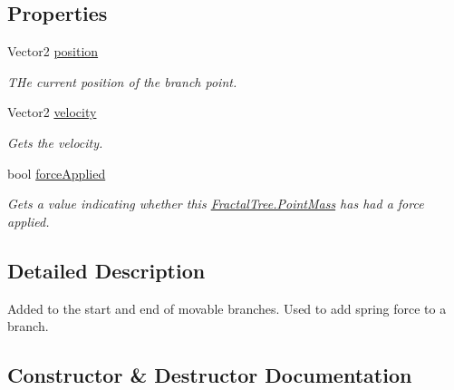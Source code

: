\subsection*{Properties}
\begin{DoxyCompactItemize}
\item 
Vector2 \hyperlink{class_fractal_tree_1_1_point_mass_a388c55b55d073a8962d8c4e61ce4fd94}{position}
\begin{DoxyCompactList}\small\item\em T\+He current position of the branch point. \end{DoxyCompactList}\item 
Vector2 \hyperlink{class_fractal_tree_1_1_point_mass_a1cbd0cc0eacfadb549cbc5fdb87ccbb1}{velocity}
\begin{DoxyCompactList}\small\item\em Gets the velocity. \end{DoxyCompactList}\item 
bool \hyperlink{class_fractal_tree_1_1_point_mass_a25ea2ddc370c2cf21b7f376bd8bb2cf6}{force\+Applied}
\begin{DoxyCompactList}\small\item\em Gets a value indicating whether this \hyperlink{class_fractal_tree_1_1_point_mass}{Fractal\+Tree.\+Point\+Mass} has had a force applied. \end{DoxyCompactList}\end{DoxyCompactItemize}


\subsection{Detailed Description}
Added to the start and end of movable branches. Used to add spring force to a branch. 



\subsection{Constructor \& Destructor Documentation}
\mbox{\label{class_fractal_tree_1_1_point_mass_aeae7254d48ee357290cc926783f76232}} 

